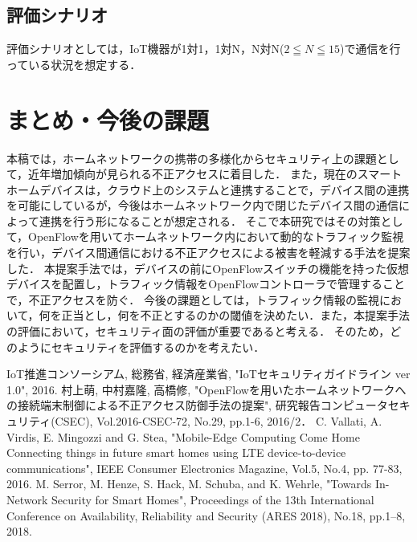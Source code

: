 \documentclass[a4paper,10pt,twocolumn,uplatex]{jsarticle}
\begin{document}
\subsection{評価シナリオ}
評価シナリオとしては，IoT機器が1対1，1対N，N対N($2\leqq N \leqq 15$)で通信を行っている状況を想定する．

\section{まとめ・今後の課題}
本稿では，ホームネットワークの携帯の多様化からセキュリティ上の課題として，近年増加傾向が見られる不正アクセスに着目した．
また，現在のスマートホームデバイスは，クラウド上のシステムと連携することで，デバイス間の連携を可能にしているが，今後はホームネットワーク内で閉じたデバイス間の通信によって連携を行う形になることが想定される．
そこで本研究ではその対策として，OpenFlowを用いてホームネットワーク内において動的なトラフィック監視を行い，デバイス間通信における不正アクセスによる被害を軽減する手法を提案した．
本提案手法では，デバイスの前にOpenFlowスイッチの機能を持った仮想デバイスを配置し，トラフィック情報をOpenFlowコントローラで管理することで，不正アクセスを防ぐ．
今後の課題としては，トラフィック情報の監視において，何を正当とし，何を不正とするのかの閾値を決めたい．また，本提案手法の評価において，セキュリティ面の評価が重要であると考える．
そのため，どのようにセキュリティを評価するのかを考えたい．

\footnotesize{
  \begin{thebibliography}{99}
     IoT推進コンソーシアム, 総務省, 経済産業省, "IoTセキュリティガイドライン ver 1.0", 2016.
     村上萌, 中村嘉隆, 高橋修, "OpenFlowを用いたホームネットワークへの接続端末制御による不正アクセス防御手法の提案", 研究報告コンピュータセキュリティ(CSEC), Vol.2016-CSEC-72, No.29, pp.1-6, 2016/2．
     C. Vallati, A. Virdis, E. Mingozzi and G. Stea, "Mobile-Edge Computing Come Home Connecting things in future smart homes using LTE device-to-device communications", IEEE Consumer Electronics Magazine, Vol.5, No.4, pp. 77-83, 2016.
     M. Serror, M. Henze, S. Hack, M. Schuba, and K. Wehrle, "Towards In-Network Security for Smart Homes", Proceedings of the 13th International Conference on Availability, Reliability and Security (ARES 2018), No.18, pp.1–8, 2018.
  \end{thebibliography}
}

\end{document}
